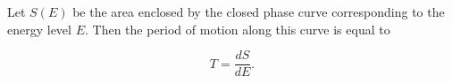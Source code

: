 Let $S(E)$ be the area enclosed by the closed phase curve corresponding to the energy level $E$. Then the period of motion along this curve is equal to

$$T = \frac{dS}{dE}.$$

